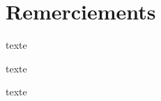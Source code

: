 \chapter*{Remerciements}

\vspace{1cm} %

\noindent  texte  
\newline

\noindent texte 
\newline

 \noindent texte
